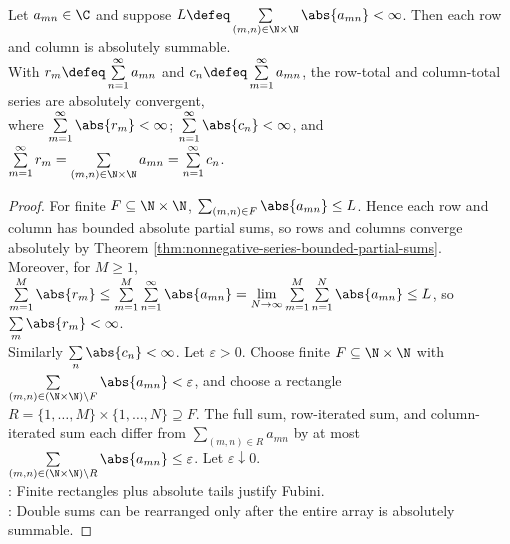 \begin{theorem} \label{thm:fubini-countable-absolute-series} \\
Let $a_{mn}\in\C$ and suppose $L\defeq\sum\limits_{(m,n)\in\N\times\N}\abs{a_{mn}}<\infty$. Then each row and column is absolutely summable.\\
With $r_m\defeq\sum\limits_{n=1}^{\infty}a_{mn}$ and $c_n\defeq\sum\limits_{m=1}^{\infty}a_{mn}$, the row-total and column-total series are absolutely convergent,\\
where $\sum\limits_{m=1}^{\infty}\abs{r_m}<\infty$; $\sum\limits_{n=1}^{\infty}\abs{c_n}<\infty$, and $\sum\limits_{m=1}^{\infty}r_m =\sum\limits_{(m,n)\in\N\times\N}a_{mn} =\sum\limits_{n=1}^{\infty}c_n$.
\begin{proof}
For finite $F\subseteq\N\times\N$, $\sum_{(m,n)\in F}\abs{a_{mn}}\leq L$. Hence each row and column has bounded absolute partial sums, so rows and columns converge absolutely by Theorem \ref{thm:nonnegative-series-bounded-partial-sums}.\\
Moreover, for $M\geq1$, $\sum\limits_{m=1}^{M}\abs{r_m} \leq \sum\limits_{m=1}^{M}\sum\limits_{n=1}^{\infty}\abs{a_{mn}} =\lim\limits_{N\to\infty}\sum\limits_{m=1}^{M}\sum\limits_{n=1}^{N}\abs{a_{mn}} \leq L$, so $\sum\limits_m\abs{r_m}<\infty$.\\
Similarly $\sum\limits_n\abs{c_n}<\infty$. Let $\varepsilon>0$. Choose finite $F\subseteq\N\times\N$ with $\sum\limits_{(m,n)\in(\N\times\N)\setminus F}\abs{a_{mn}}<\varepsilon$, and choose a rectangle $R=\{1,\ldots,M\}\times\{1,\ldots,N\}\supseteq F$. The full sum, row-iterated sum, and column-iterated sum each differ from $\sum\limits_{(m,n)\in R}a_{mn}$ by at most $\sum\limits_{(m,n)\in(\N\times\N)\setminus R}\abs{a_{mn}}\leq\varepsilon$. Let $\varepsilon\downarrow0$.\\
: Finite rectangles plus absolute tails justify Fubini.\\
: Double sums can be rearranged only after the entire array is absolutely summable.
\end{proof}
\end{theorem}

